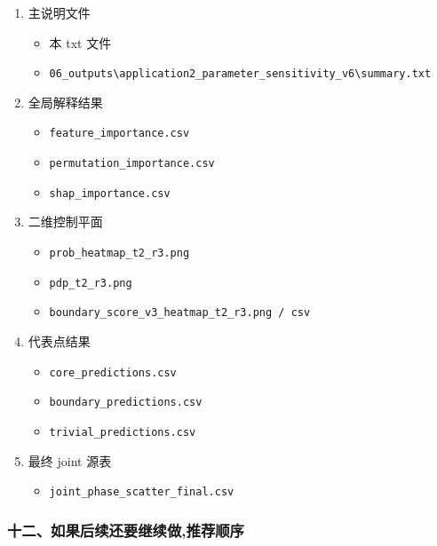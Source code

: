 \documentclass[lang=cn,scheme=chinese,color=blue,device=normal,toc=onecol,math=cm]{elegantbook}
\begin{document}
\begin{enumerate}
\item 主说明文件 
\begin{itemize}
\item 本 txt 文件
\item \texttt{06\_\allowbreak{}outputs\textbackslash{}\allowbreak{}application2\_\allowbreak{}parameter\_\allowbreak{}sensitivity\_\allowbreak{}v6\textbackslash{}\allowbreak{}summary.txt}
\end{itemize}
\item 全局解释结果 
\begin{itemize}
\item \texttt{feature\_\allowbreak{}importance.csv}
\item \texttt{permutation\_\allowbreak{}importance.csv}
\item \texttt{shap\_\allowbreak{}importance.csv}
\end{itemize}
\item 二维控制平面 
\begin{itemize}
\item \texttt{prob\_\allowbreak{}heatmap\_\allowbreak{}t2\_\allowbreak{}r3.png}
\item \texttt{pdp\_\allowbreak{}t2\_\allowbreak{}r3.png}
\item \texttt{boundary\_\allowbreak{}score\_\allowbreak{}v3\_\allowbreak{}heatmap\_\allowbreak{}t2\_\allowbreak{}r3.png /\allowbreak{} csv}
\end{itemize}
\item 代表点结果 
\begin{itemize}
\item \texttt{core\_\allowbreak{}predictions.csv}
\item \texttt{boundary\_\allowbreak{}predictions.csv}
\item \texttt{trivial\_\allowbreak{}predictions.csv}
\end{itemize}
\item 最终 joint 源表 
\begin{itemize}
\item \texttt{joint\_\allowbreak{}phase\_\allowbreak{}scatter\_\allowbreak{}final.csv}
\end{itemize}
\end{enumerate}


\subsubsection{十二、如果后续还要继续做,推荐顺序}
\end{document}
